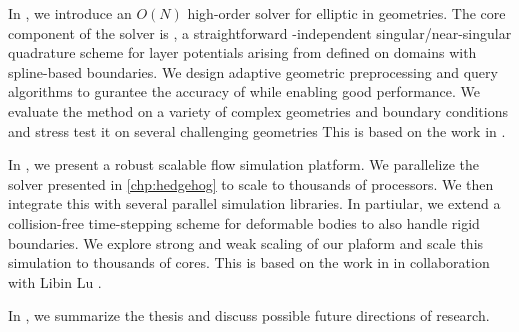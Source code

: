 In , we introduce an $O(N)$ high-order solver for elliptic \pdes in \threed geometries.
The core component of the solver is \qbkix, a straightforward \pde-independent singular/near-singular quadrature scheme for layer potentials arising from \pdes defined on domains with spline-based boundaries.
We design adaptive geometric preprocessing and query algorithms to gurantee the accuracy of \qbkix while enabling good performance. 
We evaluate the method on a variety of complex geometries and boundary conditions and stress test it on several challenging geometries
This is based on the work in \cite{morse2020robust}.

In , we present a robust scalable \rbc flow simulation platform. 
We parallelize the \pde solver presented in \cref{chp:hedgehog} to scale to thousands of processors.
We then integrate this with several parallel \rbc simulation libraries. 
In partiular, we extend a collision-free time-stepping scheme for deformable bodies to also handle rigid boundaries.
We explore strong and weak scaling of our plaform and scale this simulation to thousands of cores.
This is based on the work in \cite{lu2019scalable} in collaboration with Libin Lu \cite{lu2019parallel}.

In , we summarize the thesis and discuss possible future directions of research.
